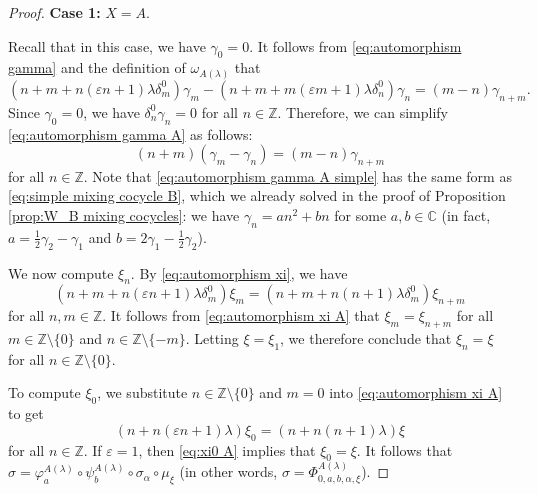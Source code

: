 \documentclass[10pt,a4paper]{amsart}
\newcommand{\CC}{\mathbb{C}}
\newcommand{\ZZ}{\mathbb{Z}}
\newcommand{\case}[2]{\vspace{2mm} \textbf{Case #1:} #2 \vspace{2mm}}
\newcommand{\nonzero}{\setminus \{0\}}
\begin{document}
\begin{proof}
    \case{1}{$X = A$.}
    
    Recall that in this case, we have $\gamma_0 = 0$. It follows from \eqref{eq:automorphism gamma} and the definition of $\omega_{A(\lambda)}$ that
    \begin{equation}\label{eq:automorphism gamma A}
        (n + m + n(\varepsilon n + 1)\lambda \delta_m^0)\gamma_m - (n + m + m(\varepsilon m + 1)\lambda \delta_n^0)\gamma_n = (m - n)\gamma_{n+m}.
    \end{equation}
    Since $\gamma_0 = 0$, we have $\delta_n^0 \gamma_n = 0$ for all $n \in \ZZ$. Therefore, we can simplify \eqref{eq:automorphism gamma A} as follows:
    \begin{equation}\label{eq:automorphism gamma A simple}
        (n + m)(\gamma_m - \gamma_n) = (m - n)\gamma_{n+m}
    \end{equation}
    for all $n \in \ZZ$. Note that \eqref{eq:automorphism gamma A simple} has the same form as \eqref{eq:simple mixing cocycle B}, which we already solved in the proof of Proposition \ref{prop:W_B mixing cocycles}: we have $\gamma_n = a n^2 + b n$ for some $a,b \in \CC$ (in fact, $a = \frac{1}{2}\gamma_2 - \gamma_1$ and $b = 2\gamma_1 - \frac{1}{2}\gamma_2$).

    We now compute $\xi_n$. By \eqref{eq:automorphism xi}, we have
    \begin{equation}\label{eq:automorphism xi A}
        (n + m + n(\varepsilon n + 1)\lambda \delta_m^0)\xi_m = (n + m + n(n + 1)\lambda \delta_m^0)\xi_{n+m}
    \end{equation}
    for all $n,m \in \ZZ$. It follows from \eqref{eq:automorphism xi A} that $\xi_m = \xi_{n+m}$ for all $m \in \ZZ \nonzero$ and $n \in \ZZ \setminus \{-m\}$. Letting $\xi = \xi_1$, we therefore conclude that $\xi_n = \xi$ for all $n \in \ZZ \nonzero$.

    To compute $\xi_0$, we substitute $n \in \ZZ \nonzero$ and $m = 0$ into \eqref{eq:automorphism xi A} to get
    \begin{equation}\label{eq:xi0 A}
        (n + n(\varepsilon n + 1)\lambda)\xi_0 = (n + n(n + 1)\lambda)\xi
    \end{equation}
    for all $n \in \ZZ$. If $\varepsilon = 1$, then \eqref{eq:xi0 A} implies that $\xi_0 = \xi$. It follows that $\sigma = \varphi_a^{A(\lambda)} \circ \psi_b^{A(\lambda)} \circ \sigma_\alpha \circ \mu_\xi$ (in other words, $\sigma = \Phi^{A(\lambda)}_{0,a,b,\alpha,\xi}$).
    

\end{proof}
\end{document}
